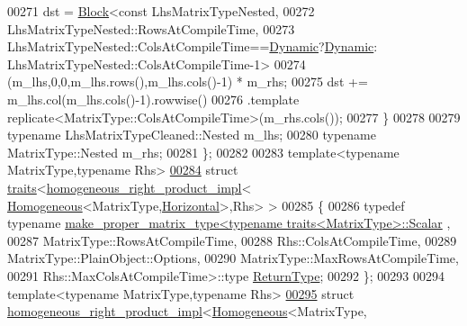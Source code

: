 \begin{DoxyCode}
00271     dst = \hyperlink{group___core___module_class_eigen_1_1_block}{Block}<\textcolor{keyword}{const} LhsMatrixTypeNested,
00272               LhsMatrixTypeNested::RowsAtCompileTime,
00273               LhsMatrixTypeNested::ColsAtCompileTime==\hyperlink{namespace_eigen_ad81fa7195215a0ce30017dfac309f0b2}{Dynamic}?\hyperlink{namespace_eigen_ad81fa7195215a0ce30017dfac309f0b2}{Dynamic}:
      LhsMatrixTypeNested::ColsAtCompileTime-1>
00274             (m\_lhs,0,0,m\_lhs.rows(),m\_lhs.cols()-1) * m\_rhs;
00275     dst += m\_lhs.col(m\_lhs.cols()-1).rowwise()
00276             .template replicate<MatrixType::ColsAtCompileTime>(m\_rhs.cols());
00277   \}
00278 
00279   \textcolor{keyword}{typename} LhsMatrixTypeCleaned::Nested m\_lhs;
00280   \textcolor{keyword}{typename} MatrixType::Nested m\_rhs;
00281 \};
00282 
00283 \textcolor{keyword}{template}<\textcolor{keyword}{typename} MatrixType,\textcolor{keyword}{typename} Rhs>
\hyperlink{struct_eigen_1_1internal_1_1traits_3_01homogeneous__right__product__impl_3_01_homogeneous_3_01_mc10ae8b83e72e7ac1f6457e2d5f54a0a}{00284} \textcolor{keyword}{struct }\hyperlink{struct_eigen_1_1internal_1_1traits}{traits}<\hyperlink{struct_eigen_1_1internal_1_1homogeneous__right__product__impl}{homogeneous\_right\_product\_impl}<
      \hyperlink{group___geometry___module_class_eigen_1_1_homogeneous}{Homogeneous}<MatrixType,\hyperlink{group__enums_ggad49a7b3738e273eb00932271b36127f7aae8a16b3b9272683c1162915f6d892be}{Horizontal}>,Rhs> >
00285 \{
00286   \textcolor{keyword}{typedef} \textcolor{keyword}{typename} \hyperlink{class_eigen_1_1internal_1_1make__proper__matrix__type}{make\_proper\_matrix\_type<typename traits<MatrixType>::Scalar}
      ,
00287                  MatrixType::RowsAtCompileTime,
00288                  Rhs::ColsAtCompileTime,
00289                  MatrixType::PlainObject::Options,
00290                  MatrixType::MaxRowsAtCompileTime,
00291                  Rhs::MaxColsAtCompileTime>::type \hyperlink{group___core___module_class_eigen_1_1_matrix}{ReturnType};
00292 \};
00293 
00294 \textcolor{keyword}{template}<\textcolor{keyword}{typename} MatrixType,\textcolor{keyword}{typename} Rhs>
\hyperlink{struct_eigen_1_1internal_1_1homogeneous__right__product__impl_3_01_homogeneous_3_01_matrix_type_ef182dac64ca84d6bf223cfad456dbfc}{00295} \textcolor{keyword}{struct }\hyperlink{struct_eigen_1_1internal_1_1homogeneous__right__product__impl}{homogeneous\_right\_product\_impl}<\hyperlink{group___geometry___module_class_eigen_1_1_homogeneous}{Homogeneous}<MatrixType,

\end{DoxyCode}
